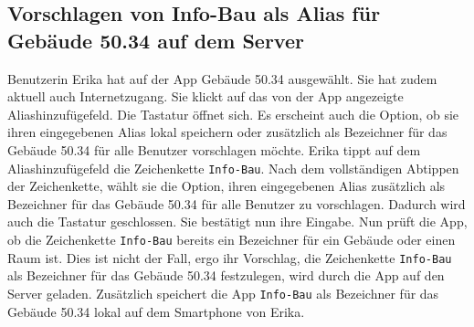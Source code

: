 \subsection{Vorschlagen von Info-Bau als Alias für Gebäude 50.34 auf dem Server}

Benutzerin Erika hat auf der App Gebäude 50.34 ausgewählt. 
Sie hat zudem aktuell auch Internetzugang. 
Sie klickt auf das von der App angezeigte Aliashinzufügefeld. 
Die Tastatur öffnet sich.  
Es erscheint auch die Option, ob sie ihren eingegebenen Alias lokal speichern oder zusätzlich als Bezeichner für das Gebäude 50.34 für alle Benutzer vorschlagen möchte. 
Erika tippt auf dem Aliashinzufügefeld die Zeichenkette \texttt{Info-Bau}.
Nach dem vollständigen Abtippen der Zeichenkette, wählt sie die Option, ihren eingegebenen Alias zusätzlich als Bezeichner für das Gebäude 50.34 für alle Benutzer zu vorschlagen. 
Dadurch wird auch die Tastatur geschlossen. 
Sie bestätigt nun ihre Eingabe. 
Nun prüft die App, ob die Zeichenkette \texttt{Info-Bau} bereits ein Bezeichner für ein Gebäude oder einen Raum ist. 
Dies ist nicht der Fall, ergo ihr Vorschlag, die Zeichenkette \texttt{Info-Bau} als Bezeichner für das Gebäude 50.34 festzulegen, wird durch die App auf den Server geladen. 
Zusätzlich speichert die App \texttt{Info-Bau} als Bezeichner für das Gebäude 50.34 lokal auf dem Smartphone von Erika.